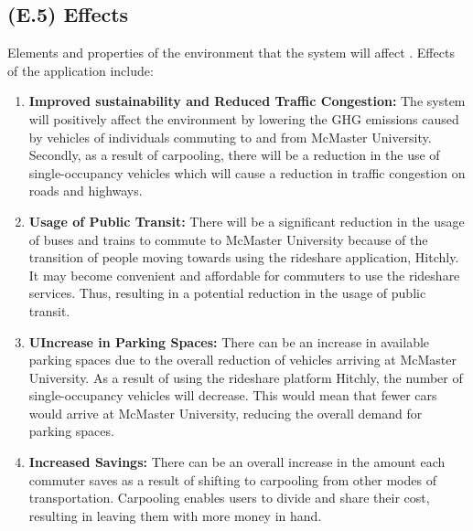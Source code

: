 \documentclass[12pt,letterpaper]{article}
\begin{document}
\subsection{(E.5) Effects}
Elements and properties of the environment that the system will affect \cite{meyer2022}. Effects of the application include:
\begin{enumerate}
\item \textbf{Improved sustainability and Reduced Traffic Congestion:} The system will positively affect the environment by lowering the GHG emissions caused by vehicles of individuals commuting to and from McMaster University. Secondly, as a result of carpooling, there will be a reduction in the use of single-occupancy vehicles which will cause a reduction in traffic congestion on roads and highways. 
\item \textbf{Usage of Public Transit:} There will be a significant reduction in the usage of buses and trains to commute to McMaster University because of the transition of people moving towards using the rideshare application, Hitchly. It may become convenient and affordable for commuters to use the rideshare services. Thus, resulting in a potential reduction in the usage of public transit.  
\item \textbf{UIncrease in Parking Spaces:} There can be an increase in available parking spaces due to the overall reduction of vehicles arriving at McMaster University. As a result of using the rideshare platform Hitchly, the number of single-occupancy vehicles will decrease. This would mean that fewer cars would arrive at McMaster University, reducing the overall demand for parking spaces.
\item \textbf{Increased Savings:} There can be an overall increase in the amount each commuter saves as a result of shifting to carpooling from other modes of transportation. Carpooling enables users to divide and share their cost, resulting in leaving them with more money in hand. 
\end{enumerate}
\end{document}
